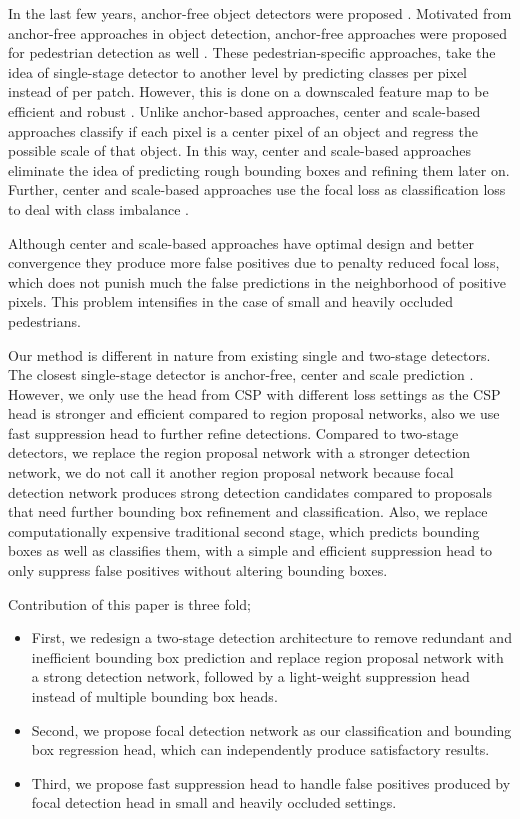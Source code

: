 \documentclass[a4paper,conference]{IEEEtran}
\begin{document}
In the last few years, anchor-free object detectors were proposed \cite{fcos, cornernet}. Motivated from anchor-free approaches in object detection, anchor-free approaches were proposed for pedestrian detection as well \cite{csp, acsp, apd}. These pedestrian-specific approaches, take the idea of single-stage detector to another level by predicting classes per pixel instead of per patch. However, this is done on a downscaled feature map to be efficient and robust \cite{csp}. Unlike anchor-based approaches, center and scale-based approaches classify if each pixel is a center pixel of an object and regress the possible scale of that object. In this way, center and scale-based approaches eliminate the idea of predicting rough bounding boxes and refining them later on. Further, center and scale-based approaches use the focal loss as classification loss to deal with class imbalance \cite{csp}.


Although center and scale-based approaches have optimal design and better convergence they produce more false positives due to penalty reduced focal loss, which does not punish much the false predictions in the neighborhood of positive pixels. This problem intensifies in the case of small and heavily occluded pedestrians.

Our method is different in nature from existing single and two-stage detectors. The closest single-stage detector is anchor-free, center and scale prediction \cite{csp}. However, we only use the head from CSP \cite{csp} with different loss settings as the CSP head \cite{csp} is stronger and efficient compared to region proposal networks, also we use fast suppression head to further refine detections. Compared to two-stage detectors, we replace the region proposal network with a stronger detection network, we do not call it another region proposal network because focal detection network produces strong detection candidates compared to proposals that need further bounding box refinement and classification. Also, we replace computationally expensive traditional second stage, which predicts bounding boxes as well as classifies them, with a simple and efficient suppression head to only suppress false positives without altering bounding boxes.


Contribution of this paper is three fold;
\begin{itemize}
 
\item First, we redesign a two-stage detection architecture to remove redundant and inefficient bounding box prediction and replace region proposal network with a strong detection network, followed by a light-weight suppression head instead of multiple bounding box heads.

\item Second, we propose focal detection network as our classification and bounding box regression head, which can independently produce satisfactory results.

\item Third, we propose fast suppression head to handle false positives produced by focal detection head in small and heavily occluded settings.
\end{itemize}
\end{document}

